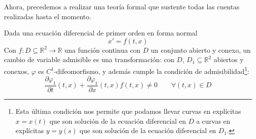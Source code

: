 Ahora, precedemos a realizar una teoría formal que sustente todas las cuentas realizadas hasta el momento.

\begin{definicion}
    Dada una ecuación diferencial de primer orden en forma normal
    \begin{equation*}
        x'=f(t,x)
    \end{equation*}
    Con $f:D\subseteq \mathbb{R}^2\rightarrow\mathbb{R}$ una función continua con $D$ un conjunto abierto y conexo, un cambio de variable admisible es una transformación:
    con $D$, $D_1\subseteq \mathbb{R}^2$ abiertos y conexos, $\varphi$ es $C^1$-difeomorfismo, y además cumple la condición de admisibilidad\footnote{Esta última condición nos permite que podamos llevar curvas en explícitas $x=x(t)$ que son solución de la ecuación diferencial en $D$ a curvas en explícitas $y=y(s)$ que son solución de la ecuación diferencial en $D_1$.}:
    \begin{equation}\label{eq:condicion_cambio_admisible}
        \dfrac{\partial\varphi_1}{\partial t}(t,x) + \dfrac{\partial\varphi_1}{\partial x}(t,x)f(t,x) \neq 0 \qquad \forall (t,x) \in D
    \end{equation}
\end{definicion}

